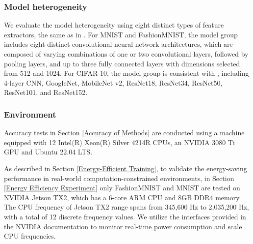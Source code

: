 \documentclass[journal]{IEEEtran}
\begin{document}
\subsubsection{Model heterogeneity}
We evaluate the model heterogeneity using eight distinct types of feature extractors, the same as in  \cite{zhang_fedtgp_2024}. For MNIST and FashionMNIST,  the model group includes eight distinct convolutional neural network architectures, which are composed of varying combinations of one or two convolutional layers, followed by pooling layers, and up to three fully connected layers with dimensions selected from 512 and 1024. For CIFAR-10, the model group is consistent with \cite{zhang_fedtgp_2024}, including 4-layer CNN, GoogleNet, MobileNet v2, ResNet18, ResNet34, ResNet50, ResNet101, and ResNet152.

\subsubsection{Environment}
Accuracy tests in Section \ref{Accuracy of Methods} are conducted using a machine equipped with 12 Intel(R) Xeon(R) Silver 4214R CPUs, an NVIDIA 3080 Ti GPU and Ubuntu 22.04 LTS.

As described in Section \ref{Energy-Efficient Training}, to validate the energy-saving performance in real-world computation-constrained environments, in Section \ref{Energy Efficiency Experiment} only FashionMNIST and MNIST are tested on NVIDIA Jetson TX2, which has a 6-core ARM CPU and 8GB DDR4 memory. The CPU frequency of Jetson TX2 range spans from 345,600 Hz to 2,035,200 Hz, with a total of 12 discrete frequency values. We utilize the interfaces provided in the NVIDIA documentation to monitor real-time power consumption and scale CPU frequencies.
\end{document}
